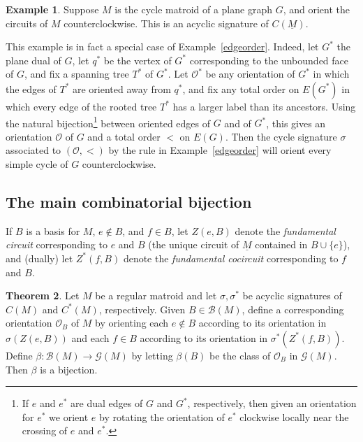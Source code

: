 \documentclass[12pt]{amsart}
\numberwithin{equation}{section}
\theoremstyle{definition}
\newtheorem{theorem}{Theorem}[subsection]
\newtheorem{example}[theorem]{Example}
\begin{document}
\begin{example}\label{planar}
Suppose $M$ is the cycle matroid of a plane graph $G$, and orient the circuits of $M$ counterclockwise.  This is an acyclic signature of $C(\underline{M})$.  

This example is in fact a special case of Example~\ref{edgeorder}.  Indeed, let $G^*$ the plane dual of $G$, let $q^*$ be the vertex of $G^*$ corresponding to the unbounded face of $G$, and fix a spanning tree $T^*$ of $G^*$.  Let $\mathcal{O}^*$ be any orientation of $G^*$ in which the edges of $T^*$ are oriented away from $q^*$, and fix any total order on $E(G^*)$ in which every edge of the rooted tree $T^*$ has a larger label than its ancestors. Using the natural bijection\footnote{If $e$ and $e^*$ are dual edges of $G$ and $G^*$, respectively, then given an orientation for $e^*$ we orient $e$ by rotating the orientation of $e^*$ clockwise locally near the crossing of $e$ and $e^*$.} between oriented edges of $G$ and of $G^*$, this gives an orientation $\mathcal{O}$ of $G$ and a total order $<$ on $E(G)$.  Then the cycle signature $\sigma$ associated to $(\mathcal{O},<)$ by the rule in Example~\ref{edgeorder} will orient every simple cycle of $G$ counterclockwise.
\end{example}






\subsection{The main combinatorial bijection}

If $B$ is a basis for $M$, $e \not\in B$, and $f \in B$, let $Z(e,B)$ denote the {\em fundamental circuit} corresponding to $e$ and $B$ (the unique circuit of $\underline{M}$ contained in $B \cup \{ e \}$), and (dually) let $Z^*(f,B)$ denote the {\em fundamental cocircuit} corresponding to $f$ and $B$.

\begin{theorem} \label{thm:combbijection}
Let $M$ be a regular matroid and let $\sigma,\sigma^*$ be acyclic signatures of $C(M)$ and $C^*(M)$, respectively.
Given $B \in {\mathcal B}(M)$, define a corresponding orientation $\mathcal{O}_B$ of $M$
by orienting each $e \not\in B$ according to its orientation in $\sigma(Z(e,B))$ and each $f \in B$ according to its orientation in $\sigma^*(Z^*(f,B))$.
Define $\beta : {\mathcal B}(M) \to {\mathcal G}(M)$ by letting $\beta(B)$ be the class of $\mathcal{O}_B$ in ${\mathcal G}(M)$.
Then $\beta$ is a bijection.
\end{theorem}
\end{document}

